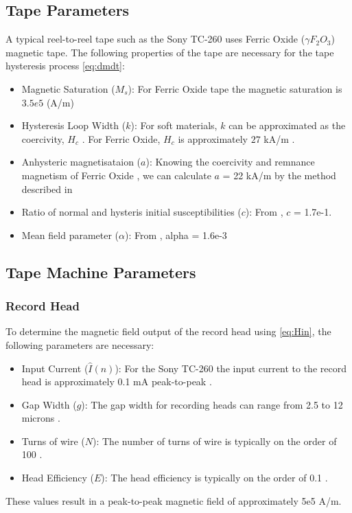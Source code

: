 \documentclass[twoside,a4paper]{article}
\begin{document}
\subsection {Tape Parameters}
A typical reel-to-reel tape such as the Sony TC-260 uses 
Ferric Oxide ($\gamma F_2O_3$) magnetic tape. The following
properties of the tape are necessary for the tape hysteresis
process \cref{eq:dmdt}:
\begin{itemize}
\item Magnetic Saturation ($M_s$): For Ferric Oxide tape
the magnetic saturation is $3.5e5$ (A/m) \cite{jilesBook}
\item Hysteresis Loop Width ($k$): For soft materials, $k$ can be approximated
as the coercivity, $H_c$ \cite{Jiles1992}. For Ferric Oxide, $H_c$ is approximately
$27$ kA/m \cite{jilesBook}.
\item Anhysteric magnetisataion ($a$): Knowing the coercivity and remnance magnetism of Ferric Oxide
\cite{jilesBook}, we can calculate $a$ = 22  kA/m by the method described in
\cite{Jiles1992}
\item Ratio of normal and hysteris initial susceptibilities ($c$): From \cite{Jiles1992}, $c$ = 1.7e-1.
\item Mean field parameter ($\alpha$): From \cite{Jiles1992}, alpha = 1.6e-3
\end{itemize}

\subsection{Tape Machine Parameters}
\subsubsection {Record Head}
To determine the magnetic field output of the
record head using \cref{eq:Hin}, the following parameters 
are necessary:
\begin{itemize}
\item Input Current ($\hat{I} (n)$): For the Sony TC-260
the input current to the record head is approximately
0.1 mA peak-to-peak \cite{RefManual}.
\item Gap Width ($g$): The gap width for recording heads
can range from 2.5 to 12 microns \cite{Kadis}.
\item Turns of wire ($N$): The number of turns of wire
is typically on the order of 100 \cite{1994tmr..book.....B}.
\item Head Efficiency ($E$): The head efficiency is typically
on the order of 0.1 \cite{1994tmr..book.....B}.
\end{itemize}
%
These values result in a peak-to-peak magnetic field
of approximately 5e5 A/m.
\end{document}
